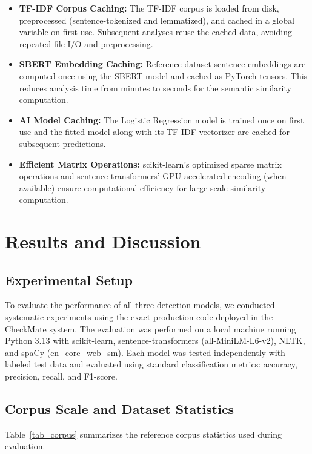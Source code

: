 \documentclass[conference]{IEEEtran}
\begin{document}
\begin{itemize}
\item \textbf{TF-IDF Corpus Caching:} The TF-IDF corpus is loaded from disk, preprocessed (sentence-tokenized and lemmatized), and cached in a global variable on first use. Subsequent analyses reuse the cached data, avoiding repeated file I/O and preprocessing.

\item \textbf{SBERT Embedding Caching:} Reference dataset sentence embeddings are computed once using the SBERT model and cached as PyTorch tensors. This reduces analysis time from minutes to seconds for the semantic similarity computation.

\item \textbf{AI Model Caching:} The Logistic Regression model is trained once on first use and the fitted model along with its TF-IDF vectorizer are cached for subsequent predictions.

\item \textbf{Efficient Matrix Operations:} scikit-learn's optimized sparse matrix operations and sentence-transformers' GPU-accelerated encoding (when available) ensure computational efficiency for large-scale similarity computation.
\end{itemize}

\section{Results and Discussion}

\subsection{Experimental Setup}

To evaluate the performance of all three detection models, we conducted systematic experiments using the exact production code deployed in the CheckMate system. The evaluation was performed on a local machine running Python 3.13 with scikit-learn, sentence-transformers (all-MiniLM-L6-v2), NLTK, and spaCy (en\_core\_web\_sm). Each model was tested independently with labeled test data and evaluated using standard classification metrics: accuracy, precision, recall, and F1-score.

\subsection{Corpus Scale and Dataset Statistics}

Table~\ref{tab_corpus} summarizes the reference corpus statistics used during evaluation.
\end{document}
